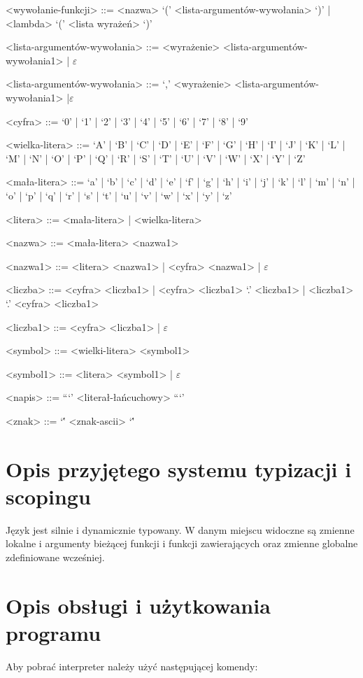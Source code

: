 \documentclass[4paper,10pt]{article}
\begin{document}
\begin{grammar}
\vskip 0.5cm

<wywołanie-funkcji>                ::= <nazwa> `(' <lista-argumentów-wywołania> `)' | <lambda> `(' <lista wyrażeń> `)'

<lista-argumentów-wywołania>       ::= <wyrażenie> <lista-argumentów-wywołania1> | $\varepsilon$

<lista-argumentów-wywołania>       ::= `,' <wyrażenie> <lista-argumentów-wywołania1> |$\varepsilon$

\vskip 0.5cm

<cyfra>         ::= `0' | `1' | `2' | `3' | `4' | `5' | `6' | `7' | `8' | `9'

<wielka-litera>   ::= `A' | `B' | `C' | `D' | `E' | `F' | `G' | `H' | `I' | `J' | `K' | `L' | `M' | `N' | `O' | `P' | `Q' | `R' | `S' | `T' | `U' | `V' | `W' | `X' | `Y' | `Z'

<mała-litera>     ::= `a' | `b' | `c' | `d' | `e' | `f' | `g' | `h' | `i' | `j' | `k' | `l' | `m' | `n' | `o' | `p' | `q' | `r' | `s' | `t' | `u' | `v' | `w' | `x' | `y' | `z'

\vskip 0.5cm

<litera>          ::= <mała-litera> | <wielka-litera>

<nazwa>         ::= <mała-litera> <nazwa1>

<nazwa1>        ::= <litera> <nazwa1> | <cyfra> <nazwa1> | $\varepsilon$

<liczba>        ::= <cyfra> <liczba1> | <cyfra> <liczba1> `.' <liczba1> | <liczba1> `.' <cyfra> <liczba1>

<liczba1>       ::= <cyfra> <liczba1> | $\varepsilon$

<symbol>        ::= <wielki-litera> <symbol1>

<symbol1>       ::= <litera> <symbol1> | $\varepsilon$

<napis>         ::= ```' <literał-łańcuchowy> ```'

<znak>			::= `\'' <znak-ascii> `\''

\end{grammar}

\section{Opis przyjętego systemu typizacji i scopingu}
	Język jest silnie i dynamicznie typowany.
	W danym miejscu widoczne są zmienne lokalne i argumenty bieżącej funkcji i funkcji zawierających oraz zmienne globalne zdefiniowane wcześniej.

\section{Opis obsługi i użytkowania programu}
	Aby pobrać interpreter należy użyć następującej komendy: 
	
\end{document}
